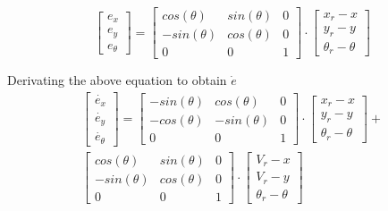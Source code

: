 \documentclass[conference]{IEEEtran}
\begin{document}
\begin{equation}\label{eq}
\begin{bmatrix}
e_{x}\\ 
e_{y}\\ 
e_{\theta}
\end{bmatrix}
=
\begin{bmatrix}
cos(\theta) & sin(\theta) & 0\\ 
-sin(\theta) & cos(\theta) & 0\\ 
0 & 0 & 1
\end{bmatrix}
\cdot
\begin{bmatrix}
x_{r}-x\\ 
y_{r}-y\\ 
\theta_{r}-\theta
\end{bmatrix}
\end{equation}

Derivating the above equation to obtain $\dot{e}$
\begin{equation}\label{eeq}
\begin{split}
\begin{bmatrix}
\dot{e_{x}}\\ 
\dot{e_{y}}\\ 
\dot{e_{\theta}}
\end{bmatrix}
=
\begin{bmatrix}
-sin(\theta) & cos(\theta) & 0\\ 
-cos(\theta) & -sin(\theta) & 0\\ 
0 & 0 & 1
\end{bmatrix}
\cdot
\begin{bmatrix}
x_{r}-x\\ 
y_{r}-y\\ 
\theta_{r}-\theta
\end{bmatrix}
+\\
\begin{bmatrix}
cos(\theta) & sin(\theta) & 0\\ 
-sin(\theta) & cos(\theta) & 0\\ 
0 & 0 & 1
\end{bmatrix}
\cdot
\begin{bmatrix}
V_{r}-x\\ 
V_{r}-y\\ 
\theta_{r}-\theta
\end{bmatrix}
\end{split}
\end{equation}
\end{document}
